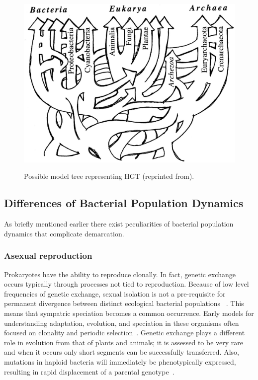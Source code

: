 \begin{figure}
\centering
\includegraphics[scale=0.25]{images/HGTTree-CH1}
\label{fig:HGTmodel}
\caption[Possible model tree representing HGT.]{Possible model tree representing HGT (reprinted from\protect\cite{doolittle1999phylogenetic}).}
\label{fig:HGTmodel}
\end{figure}

\subsection{Differences of Bacterial Population Dynamics}
As briefly mentioned earlier there exist peculiarities of bacterial population dynamics that complicate demarcation.

\subsubsection*{Asexual reproduction}
Prokaryotes have the ability to reproduce clonally.
In fact, genetic exchange occurs typically through processes not tied to reproduction.
Because of low level frequencies of genetic exchange, sexual isolation is not a pre-requisite for permanent divergence between distinct ecological bacterial populations ~\cite{cohan2007systematics}.
This means that sympatric speciation becomes a common occurrence.
Early models for understanding adaptation, evolution, and speciation in these organisms often focused on clonality and periodic selection~\cite{gogarten2002prokaryotic}.
Genetic exchange plays a different role in evolution from that of plants and animals; it is assessed to be very rare and when it occurs only short segments can be successfully transferred.
Also, mutations in haploid bacteria will immediately be phenotypically expressed, resulting in rapid displacement of a parental genotype~\cite{staley1997biodiversity}.

